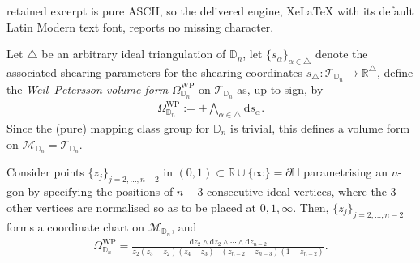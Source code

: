 \documentclass[10pt,a4paper]{amsart}
\newcommand{\HH}{\mathbb{H}}
\newcommand{\RR}{\mathbb{R}}
\begin{document}
retained excerpt is pure ASCII, so the delivered engine, XeLaTeX with its default Latin Modern text font, reports no missing character.
\begin{definition}
Let $\triangle$ be an arbitrary ideal triangulation of $\mathbb{D}_n$, let $\{s_\alpha\}_{\alpha\in\triangle}$ denote the associated shearing parameters for the shearing coordinates $s_\triangle:\mathcal{T}_{\mathbb{D}_n}\to\mathbb{R}^{\triangle}$, define the \emph{Weil--Petersson volume form} $\Omega^{\mathrm{WP}}_{\mathbb{D}_n}$ on $\mathcal{T}_{\mathbb{D}_n}$ as, up to sign, by
\begin{align}
\label{eq:vol-form-n-gon}  
\Omega^{\mathrm{WP}}_{\mathbb{D}_n} 
:= \pm \bigwedge_{\alpha\in\triangle}\mathrm{d}s_\alpha.
\end{align}
Since the (pure) mapping class group for $\mathbb{D}_n$ is trivial, this defines a volume form on $\mathcal{M}_{\mathbb{D}_n}=\mathcal{T}_{\mathbb{D}_n}$.
\end{definition}

\begin{proposition}
\label{prop:vol-form-n-gon}
Consider points $\{z_j\}_{j=2,\ldots,n-2}$ in $(0,1)\subset\RR\cup\{\infty\}=\partial\HH$ parametrising an $n$-gon by specifying the positions of $n-3$ consecutive ideal vertices, where the $3$ other vertices are normalised so as to be placed at $0,1,\infty$. Then, $\{z_j\}_{j=2,\ldots,n-2}$ forms a coordinate chart on $\mathcal{M}_{\mathbb{D}_n}$, and
\begin{align}
\Omega^{\mathrm{WP}}_{\mathbb{D}_n}
=
\frac{\mathrm{d}z_2\wedge \mathrm{d}z_2\wedge\cdots\wedge \mathrm{d}z_{n-2}}
{z_2(z_3-z_2)(z_4-z_3)\cdots (z_{n-2}-z_{n-3})(1-z_{n-2})}.
\label{eq:chekhovngoncase}
\end{align}

\end{proposition}
\end{document}
